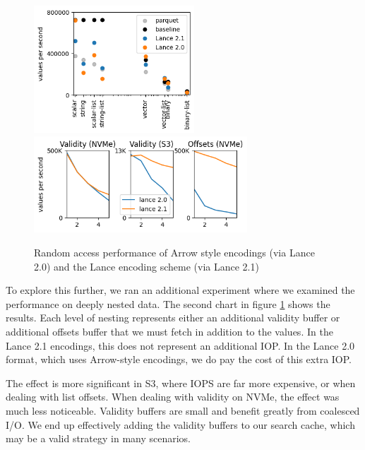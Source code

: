 \documentclass[sigconf, nonacm]{acmart}
\begin{document}
\begin{figure}[h]
    \centering
    \includegraphics[width=6cm]{figures/take_lance.png}
    \includegraphics[width=8cm]{figures/nesting.png}
    \caption{Random access performance of Arrow style encodings (via Lance 2.0) and the Lance encoding scheme (via Lance 2.1)}
    \label{fig:lance-random}
\end{figure}

To explore this further, we ran an additional experiment where we examined the performance on deeply nested data.  The second chart in figure \ref{fig:lance-random} shows the results.  Each level of nesting represents either an additional validity buffer or additional offsets buffer that we must fetch in addition to the values.  In the Lance 2.1 encodings, this does not represent an additional IOP.  In the Lance 2.0 format, which uses Arrow-style encodings, we do pay the cost of this extra IOP.

The effect is more significant in S3, where IOPS are far more expensive, or when dealing with list offsets.  When dealing with validity on NVMe, the effect was much less noticeable.  Validity buffers are small and benefit greatly from coalesced I/O.  We end up effectively adding the validity buffers to our search cache, which may be a valid strategy in many scenarios.
\end{document}
